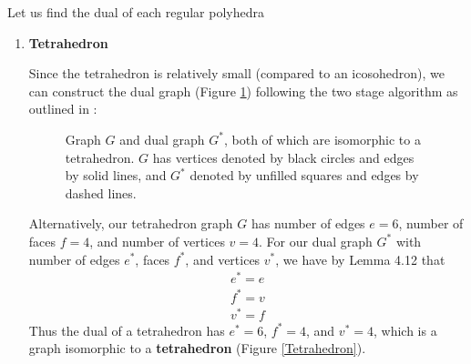 \documentclass[11pt, oneside]{article}   	%
\begin{document}
Let us find the dual of each regular polyhedra
\begin{enumerate}
	\item \textbf{Tetrahedron}
	
	Since the tetrahedron is relatively small (compared to an icosohedron), we can construct the dual graph (Figure \ref{Tetrahedron Dual}) following the two stage algorithm as outlined in \cite{graph}:
	\begin{figure}[h]           
            \centering
            \caption{Graph $G$ and dual graph $G^*$, both of which are isomorphic to a tetrahedron.  $G$ has vertices denoted by black circles and edges by solid lines, and $G^*$ denoted by unfilled squares and edges by dashed lines.}
            \label{Tetrahedron Dual}
        \end{figure}
	
	Alternatively, our tetrahedron graph $G$ has number of edges $e=6$, number of faces $f=4$, and number of vertices $v=4$. For our dual graph $G^*$ with number of edges $e^*$, faces $f^*$, and vertices $v^*$, we have by Lemma 4.12 \cite{graph}
 that 
 \begin{align*}
 	e^* = e \\
	f^* = v \\
	v^*=f
 \end{align*}
	Thus the dual of a tetrahedron has $e^*=6$, $f^*=4$, and $v^*=4$, which is a graph isomorphic to a \textbf{tetrahedron}  (Figure \ref{Tetrahedron}).
	

\end{enumerate}
\end{document}
